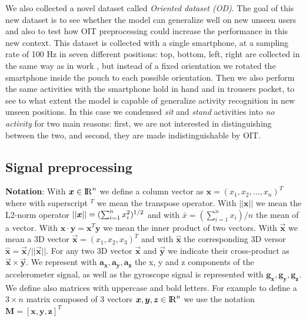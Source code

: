 We also collected a novel dataset called \textit{Oriented dataset
  (OD)}. The goal of this new dataset is to see whether the model can
generalize well on new unseen users and also to test how OIT
preprocessing could increase the performance in this new context. This
dataset is collected with a single smartphone, at a sampling rate of
100 Hz in seven different positions: top, bottom, left, right are
collected in the same way as in work \cite{stisen2015smart}, but
instead of a fixed orientation we rotated the smartphone inside the
pouch to each possible orientation. Then we also perform the same
activities with the smartphone hold in hand and in trousers pocket, to
see to what extent the model is capable of generalize activity
recognition in new unseen positions. In this case we condensed
\textit{sit} and \textit{stand} activities into \textit{no activity}
for two main reasons: first, we are not interested in distinguishing
between the two, and second, they are made indistinguishable by OIT.

\subsection{Signal preprocessing}

\textbf{Notation}: With $\boldsymbol{x} \in {\rm I\!R}^{n}$ we define a column vector as $\boldsymbol{x}=(x_{1}, x_{2}, ..., x_{n})^{T}$ where with superscript $^T$ we mean the transpose operator. With $\boldsymbol{||x||}$ we mean the L2-norm operator $||\boldsymbol{x}|| = (\sum_{i=1}^{n} x_{i}^{2})^{1/2}$ and with $\bar{x} = (\sum_{i=1}^{n} x_{i}) / n$ the mean of a vector. With $\boldsymbol{x} \cdot \boldsymbol{y} =\boldsymbol{x}^{T}\boldsymbol{y} $ we mean the inner product of two vectors. With $\boldsymbol{\vec{x}}$ we mean a 3D vector $\boldsymbol{\vec{x}} = (x_{1}, x_{2}, x_{3})^{T}$ and with $\boldsymbol{\hat{x}}$ the corresponding 3D versor $\boldsymbol{\hat{x}}=\boldsymbol{\vec{x}}/ ||\boldsymbol{\vec{x}}||$. For any two 3D vector $\boldsymbol{\vec{x}}$ and $\boldsymbol{\vec{y}}$ we indicate their cross-product as $\boldsymbol{\vec{x}} \times \boldsymbol{\vec{y}}$. We represent with $\boldsymbol{a_{x}}, \boldsymbol{a_{y}}, \boldsymbol{a_{z}}$ the x, y and z components of the accelerometer signal, as well as the gyroscope signal is represented with $\boldsymbol{g_{x}}, \boldsymbol{g_{y}}, \boldsymbol{g_{z}}$. We define also matrices with uppercase and bold letters. For example to define a $3 \times n$ matrix composed of 3 vectors \mbox{$\boldsymbol{x}, \boldsymbol{y}, \boldsymbol{z} \in {\rm I\!R}^{n}$} we use the notation \mbox{$\boldsymbol{M} = [\boldsymbol{x}, \boldsymbol{y}, \boldsymbol{z}]^{T}$}\\


